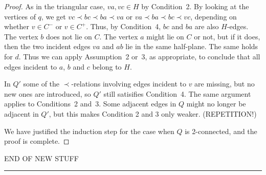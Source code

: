 \documentclass{patmorin}
\begin{document}
\begin{proof}
As in the triangular case, $va,vc\in H$ by Condition~2.
By looking at the vertices of $q$, we get
$vc \prec bc\prec ba\prec va$ or 
$va \prec ba\prec bc\prec vc$,
 depending on whether $v\in C^-$ or
$v\in C^+$. 
Thus, by Condition~4, $bc$ and $ba$ are also $H$-edges.
The vertex $b$ does not lie on $C$.
The vertex $a$ might lie on $C$ or not, but if it does,
then the two incident edges $va$ and $ab$ lie in the same half-plane.
 The same holds for $d$.
Thus we can apply Assumption~2 or~3, as appropriate,
 to conclude that all edges incident
to $a$, $b$ and $c$ belong to $H$.


   In $Q'$ some of the $\prec$-relations involving edges incident
   to $v$ are missing, but no new ones are introduced, so $Q'$ still
   satisifies Condition~4.
The same argument applies to
Conditions~2 and~3. Some adjacent edges in $Q$ might no longer be adjacent
in $Q'$, but this makes Condition 2 and 3 only weaker. (REPETITION!)


We have justified the induction step for the case when $Q$ is
2-connected, and
   the proof is complete.
\end{proof}


END OF NEW STUFF
\hrule
\end{document}
